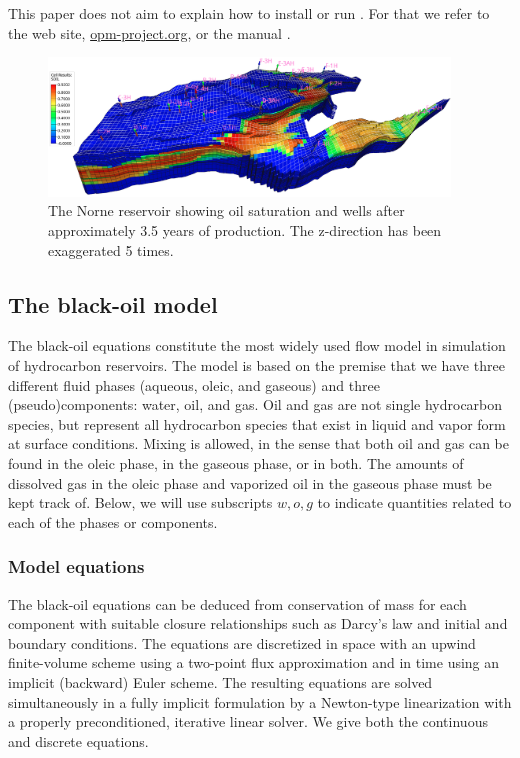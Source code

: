 This paper does not aim to explain how to install or run \opmflow. For
that we refer to the web site, \href{http://opm-project.org}{opm-project.org}, or the \opmflow manual
\cite{flowmanual}.

\begin{figure}
\centering
\includegraphics[width=0.95\textwidth]{figures/norne/norne-soil}
\caption{The Norne reservoir showing oil saturation and wells after
  approximately 3.5 years of production. The z-direction has been
  exaggerated 5 times.}
\label{fig:norne-soil}
\end{figure}


\subsection{The black-oil model}
\label{sec:black-oil}

The black-oil equations constitute the most widely used flow model in
simulation of hydrocarbon reservoirs. The model is based on the
premise that we have three different fluid phases (aqueous, oleic, and
gaseous) and three (pseudo)components: water, oil, and gas.  Oil and gas
are not single hydrocarbon species, but represent all hydrocarbon species that
exist in liquid and vapor form at {\revised surface} conditions.  Mixing is allowed, in
the sense that both oil and gas can be found in the
oleic phase, in the gaseous phase, or in both. The amounts of dissolved
gas in the oleic phase and vaporized oil in the gaseous phase must
be kept track of. Below, we will use subscripts $w, o, g$ to indicate
quantities related to each of the phases or components.

\subsubsection{Model equations}

The black-oil equations can be deduced from conservation of mass for each
component with suitable closure relationships such as Darcy's law and initial
and boundary conditions.  The equations are discretized in space with
an upwind finite-volume scheme using a two-point flux approximation
and in time using an implicit (backward) Euler scheme. The resulting
equations are solved simultaneously in a fully implicit formulation by
a Newton-type linearization with a properly preconditioned, iterative
linear solver. We give both the continuous and discrete equations.

